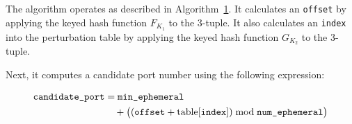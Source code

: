 \documentclass[twocolumn]{report}
\begin{document}
%
%
The algorithm operates as described in Algorithm~\hyperref[alg:dhps_port_selection]{1}. It calculates an \texttt{offset} by applying the keyed hash function \( F_{K_1} \) to the 3-tuple. It also calculates an \texttt{index} into the perturbation table by applying the keyed hash function \( G_{K_2} \) to the 3-tuple.

Next, it computes a \alert{candidate port number} using the following expression:

\vspace{-0.4cm}
\begin{minipage}{\columnwidth}
	\begin{equation*}
		\begin{split}
			\texttt{candidate\_port}
			 & = \texttt{min\_ephemeral}      \\
			 & \quad + \bigl((\texttt{offset}
			+ \text{table[{\texttt{index}}]})
			\bmod \texttt{num\_ephemeral}\bigr)
		\end{split}
	\end{equation*}
\end{minipage}
\end{document}
